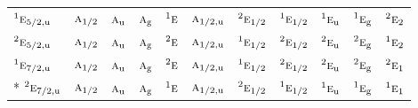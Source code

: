 \documentclass[10pt,a4paper]{article}
\numberwithin{equation}{section}
\newcommand{\irr}[1]{\text{\normalfont\scshape #1}}
\newcommand{\conjpair}[1]{{}^{#1}}
\newcommand{\ptag}[1]{\mathrm{#1}}
\begin{document}
{\begin{longtable}{@{}lcccccccccc@{}}
$\conjpair{1}\irr{e}_{5/2,\ptag{u}}$ & $\irr{a}_{1/2}$ & $\irr{a}_{\ptag{u}}$ & $\irr{a}_{\ptag{g}}$ & $\conjpair{1}\irr{e}$ & $\irr{a}_{1/2,\ptag{u}}$ & $\conjpair{2}\irr{e}_{1/2}$ & $\conjpair{1}\irr{e}_{1/2}$ & $\conjpair{1}\irr{e}_{\ptag{u}}$ & $\conjpair{1}\irr{e}_{\ptag{g}}$ & $\conjpair{2}\irr{e}_{2}$\\
$\conjpair{2}\irr{e}_{5/2,\ptag{u}}$ & $\irr{a}_{1/2}$ & $\irr{a}_{\ptag{u}}$ & $\irr{a}_{\ptag{g}}$ & $\conjpair{2}\irr{e}$ & $\irr{a}_{1/2,\ptag{u}}$ & $\conjpair{1}\irr{e}_{1/2}$ & $\conjpair{2}\irr{e}_{1/2}$ & $\conjpair{2}\irr{e}_{\ptag{u}}$ & $\conjpair{2}\irr{e}_{\ptag{g}}$ & $\conjpair{1}\irr{e}_{2}$\\
$\conjpair{1}\irr{e}_{7/2,\ptag{u}}$ & $\irr{a}_{1/2}$ & $\irr{a}_{\ptag{u}}$ & $\irr{a}_{\ptag{g}}$ & $\conjpair{2}\irr{e}$ & $\irr{a}_{1/2,\ptag{u}}$ & $\conjpair{1}\irr{e}_{1/2}$ & $\conjpair{2}\irr{e}_{1/2}$ & $\conjpair{2}\irr{e}_{\ptag{u}}$ & $\conjpair{2}\irr{e}_{\ptag{g}}$ & $\conjpair{2}\irr{e}_{1}$\\*
$\conjpair{2}\irr{e}_{7/2,\ptag{u}}$ & $\irr{a}_{1/2}$ & $\irr{a}_{\ptag{u}}$ & $\irr{a}_{\ptag{g}}$ & $\conjpair{1}\irr{e}$ & $\irr{a}_{1/2,\ptag{u}}$ & $\conjpair{2}\irr{e}_{1/2}$ & $\conjpair{1}\irr{e}_{1/2}$ & $\conjpair{1}\irr{e}_{\ptag{u}}$ & $\conjpair{1}\irr{e}_{\ptag{g}}$ & $\conjpair{1}\irr{e}_{1}$\\
\bottomrule\end{longtable}}
\end{document}
